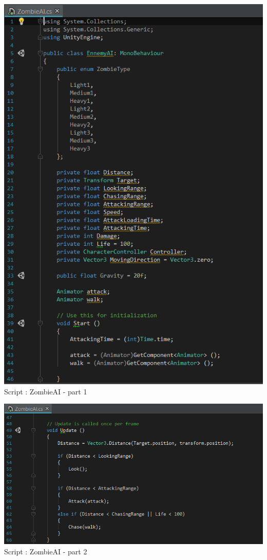 \documentclass[12pt]{article}
\begin{document}
\begin{center}
    \includegraphics[scale = 0.85]{Script_ZombieAI_-_1.PNG}\\[1cm]
    Script : ZombieAI - part 1
    
    \includegraphics[scale = 0.75]{Script_ZombieAI_-_2.PNG}\\[1cm]
    Script : ZombieAI - part 2
    \bigskip
    

\end{center}
\end{document}
